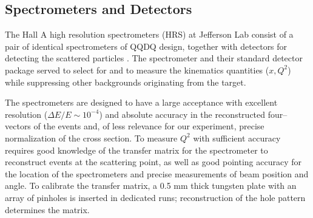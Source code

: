 \subsection{Spectrometers and Detectors}\label{sec:HRS}

The Hall A high resolution spectrometers (HRS) at
Jefferson Lab consist of a pair
of identical spectrometers of QQDQ design,
together with detectors for detecting the 
scattered particles \cite{A-NIM}.
The spectrometer and their standard detector 
package served to select for and to 
measure the kinematics quantities ($x, Q^2$)
while suppressing other backgrounds originating
from the target.

\par
The spectrometers are designed to have a
large acceptance with excellent resolution ($\Delta E / E \sim 10^{-4}$)
and absolute accuracy
in the reconstructed
four--vectors of the events and, 
of less relevance for our experiment,
precise normalization of the cross section.
To measure $Q^2$ with sufficient accuracy
requires good knowledge of the transfer matrix for
the spectrometer to reconstruct events at the
scattering point, as well as
good pointing accuracy for the location of the
spectrometers and precise measurements 
of beam position and angle.
To calibrate the transfer matrix, a 0.5 mm thick 
tungsten plate with an array of pinholes
is inserted in dedicated runs; reconstruction
of the hole pattern determines the matrix.
